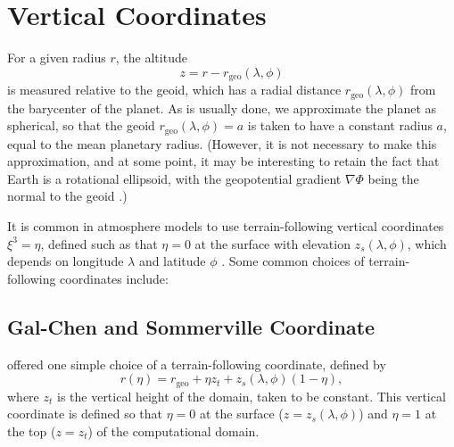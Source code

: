 \documentclass{report}
\begin{document}
\section{Vertical Coordinates}

For a given radius $r$, the altitude 
\begin{equation}
    z = r - r_\mathrm{geo}(\lambda,\phi)
\end{equation}
is measured relative to the geoid, which has a radial distance $r_\mathrm{geo}(\lambda,\phi)$ from the barycenter of the planet. As is usually done, we approximate the planet as spherical, so that the geoid $r_\mathrm{geo}(\lambda,\phi) = a$ is taken to have a constant radius $a$, equal to the mean planetary radius. (However, it is not necessary to make this approximation, and at some point, it may be interesting to retain the fact that Earth is a rotational ellipsoid, with the geopotential gradient $\nabla \Phi$ being the normal to the geoid \citep{Baldauf20a}.)

It is common in atmosphere models to use terrain-following vertical coordinates $\xi^3=\eta$, defined such as that $\eta=0$ at the surface with elevation $z_s(\lambda, \phi)$, which depends on longitude $\lambda$ and latitude $\phi$ \citep{Kasahara74a}. Some common choices of terrain-following coordinates include:

\subsection{Gal-Chen and Sommerville Coordinate} \citet{Gal-Chen75a} offered one simple choice of a terrain-following coordinate, defined by 
\begin{equation}\label{e:Gal-Chen}
    r(\eta) = r_\mathrm{geo} + \eta z_t + z_s(\lambda, \phi)(1 - \eta),
\end{equation}
where $z_t$ is the vertical height of the domain, taken to be constant. This vertical coordinate is defined so that $\eta = 0$ at the surface ($z=z_s(\lambda, \phi)$) and $\eta = 1$ at the top ($z=z_t$) of the computational domain.
\end{document}
